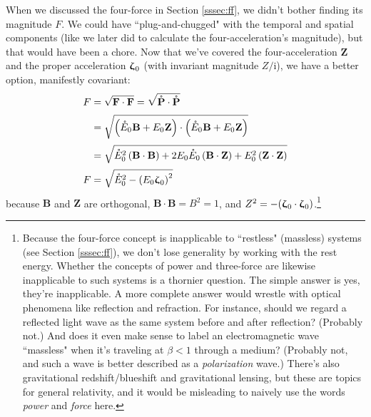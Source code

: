 \documentclass[12pt]{article}
\renewcommand{\vv}[1]{\mathbf{#1}}
\newcommand{\vvzeta}{\bm{\upzeta}}
\begin{document}
When we discussed the four-force in Section \ref{sssec:ff}, we didn't bother finding its magnitude $F$. We could have ``plug-and-chugged" with the temporal and spatial components (like we later did to calculate the four-acceleration's magnitude), but that would have been a chore. Now that we've covered the four-acceleration $\vv Z$ and the proper acceleration $\vvzeta_{\mkern1mu 0}$ (with invariant magnitude $Z/\mathrm{i}$), we have a better option, manifestly covariant:
\begin{equation}\label{eq:40}
\begin{split}
F &= \sqrt{\vv F \cdot \vv F} = \sqrt{\mathring{\vv P} \cdot \mathring{\vv P}} \\[2pt]
&= \sqrt{ \left( \mathring{E}_0 \mkern.5mu \vv B + E_0 \mkern.5mu \vv Z \right) \cdot \left( \mathring{E}_0 \mkern.5mu \vv B + E_0 \mkern.5mu \vv Z \right) }\\[2pt]
&= \sqrt{ \mathring{E}_0^2 \left( \vv B \cdot \vv B \right) + 2 E_0 \mathring{E}_0 \left( \vv B \cdot \vv Z \right) + E_0^2 \left( \vv Z \cdot \vv Z \right) } \\[2pt]
F &= \sqrt{ \mathring{E}_0^2 - \left( E_0 \vvzeta_{\mkern1mu 0} \right)^2 }
\end{split}
\end{equation}
because $\vv B$ and $\vv Z$ are orthogonal, $\vv B \cdot \vv B = B^2 = 1$, and $Z^2 = - (\vvzeta_{\mkern1mu 0} \cdot \vvzeta_{\mkern1mu 0})$.\footnote{Because the four-force concept is inapplicable to ``restless" (massless) systems (see Section \ref{sssec:ff}), we don't lose generality by working with the rest energy. Whether the concepts of power and three-force are likewise inapplicable to such systems is a thornier question. The simple answer is yes, they're inapplicable. A more complete answer would wrestle with optical phenomena like reflection and refraction. For instance, should we regard a reflected light wave as the same system before and after reflection? (Probably not.) And does it even make sense to label an electromagnetic wave ``massless" when it's traveling at $\beta < 1$ through a medium? (Probably not, and such a wave is better described as a \emph{polarization} wave.) There's also gravitational redshift/blueshift and gravitational lensing, but these are topics for general relativity, and it would be misleading to naively use the words \emph{power} and \emph{force} here.}
\end{document}
